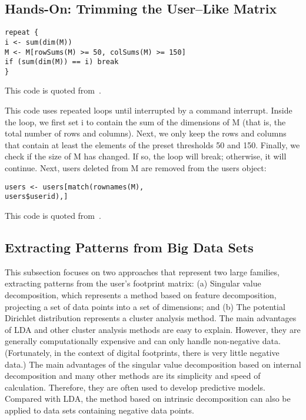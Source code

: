 \subsection{Hands-On: Trimming the User–Like Matrix}

\begin{verbatim}
repeat {
i <- sum(dim(M))
M <- M[rowSums(M) >= 50, colSums(M) >= 150]
if (sum(dim(M)) == i) break
}
\end{verbatim}

This code is quoted from~\cite{editor12}.

This code uses repeated loops until interrupted by a command 
interrupt. Inside the loop, we first set i to contain the sum of 
the dimensions of M (that is, the total number of rows and 
columns). Next, we only keep the rows and columns that contain at 
least the elements of the preset thresholds 50 and 150. Finally, 
we check if the size of M has changed. If so, the loop will break;
 otherwise, it will continue.
Next, users deleted from M are removed from the users object:

\begin{verbatim}
users <- users[match(rownames(M),
users$userid),]
\end{verbatim}

This code is quoted from~\cite{editor12}.

\subsection{Extracting Patterns from Big Data Sets}

This subsection focuses on two approaches that represent two large 
families, extracting patterns from the user's footprint matrix: 
(a) Singular value decomposition, which represents a method based 
on feature decomposition, projecting a set of data points into a 
set of dimensions; and (b) The potential Dirichlet distribution 
represents a cluster analysis method. The main advantages of LDA 
and other cluster analysis methods are easy to explain. However, 
they are generally computationally expensive and can only handle 
non-negative data. (Fortunately, in the context of digital 
footprints, there is very little negative data.) The main 
advantages of the singular value decomposition based on internal 
decomposition and many other methods are its simplicity and speed 
of calculation. Therefore, they are often used to develop 
predictive models. Compared with LDA, the method based on 
intrinsic decomposition can also be applied to data sets containing
 negative data points.

